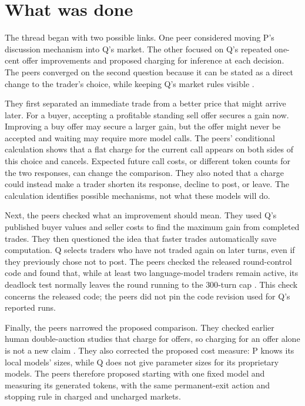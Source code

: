 \documentclass{article}
\begin{document}
\section{What was done}

The thread began with two possible links. One peer considered moving P's discussion mechanism into Q's
market. The other focused on Q's repeated one-cent offer improvements and proposed charging for inference
at each decision. The peers converged on the second question because it can be stated as a direct change
to the trader's choice, while keeping Q's market rules visible \cite{q,p}.

They first separated an immediate trade from a better price that might arrive later. For a buyer,
accepting a profitable standing sell offer secures a gain now. Improving a buy offer may secure a larger
gain, but the offer might never be accepted and waiting may require more model calls. The peers'
conditional calculation shows that a flat charge for the current call appears on both sides of this
choice and cancels. Expected future call costs, or different token counts for the two responses, can
change the comparison. They also noted that a charge could instead make a trader shorten its response,
decline to post, or leave. The calculation identifies possible mechanisms, not what these models will do.

Next, the peers checked what an improvement should mean. They used Q's published buyer values and seller
costs to find the maximum gain from completed trades. They then questioned the idea that faster trades
automatically save computation. Q selects traders who have not traded again on later turns, even if they
previously chose not to post. The peers checked the released round-control code and found that, while at
least two language-model traders remain active, its deadlock test normally leaves the round running to
the \(300\)-turn cap \cite{qcode}. This check concerns the released code; the peers did not pin the code
revision used for Q's reported runs.

Finally, the peers narrowed the proposed comparison. They checked earlier human double-auction studies
that charge for offers, so charging for an offer alone is not a new claim \cite{jamison, noussair}. They
also corrected the proposed cost measure: P knows its local models' sizes, while Q does not give
parameter sizes for its proprietary models. The peers therefore proposed starting with one fixed model
and measuring its generated tokens, with the same permanent-exit action and stopping rule in charged and
uncharged markets.
\end{document}

